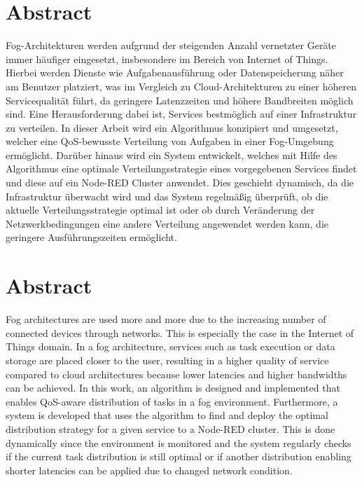 \newpage

\section*{Abstract}

Fog-Architekturen werden aufgrund der steigenden Anzahl vernetzter Geräte immer häufiger eingesetzt, insbesondere im Bereich von Internet of Things.
Hierbei werden Dienste wie Aufgabenausführung oder Datenspeicherung näher am Benutzer platziert, was im Vergleich zu Cloud-Architekturen zu einer höheren Servicequalität führt, da geringere Latenzzeiten und höhere Bandbreiten möglich sind.
Eine Herausforderung dabei ist, Services bestmöglich auf einer Infrastruktur zu verteilen.
In dieser Arbeit wird ein Algorithmus konzipiert und umgesetzt, welcher eine QoS-bewusste Verteilung von Aufgaben in einer Fog-Umgebung ermöglicht.
Darüber hinaus wird ein System entwickelt, welches mit Hilfe des Algorithmus eine optimale Verteilungsstrategie eines vorgegebenen Services findet und diese auf ein Node-RED Cluster anwendet.
Dies geschieht dynamisch, da die Infrastruktur überwacht wird und das System regelmäßig überprüft, ob die aktuelle Verteilungsstrategie optimal ist oder ob durch Veränderung der Netzwerkbedingungen eine andere Verteilung angewendet werden kann, die geringere Ausführungszeiten ermöglicht.


\section*{Abstract}

Fog architectures are used more and more due to the increasing number of connected devices through networks.
This is especially the case in the Internet of Things domain.
In a fog architecture, services such as task execution or data storage are placed closer to the user, resulting in a higher quality of service compared to cloud architectures because lower latencies and higher bandwidths can be achieved.
In this work, an algorithm is designed and implemented that enables QoS-aware distribution of tasks in a fog environment.
Furthermore, a system is developed that uses the algorithm to find and deploy the optimal distribution strategy for a given service to a Node-RED cluster.
This is done dynamically since the environment is monitored and the system regularly checks if the current task distribution is still optimal or if another distribution enabling shorter latencies can be applied due to changed network condition.
